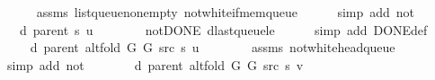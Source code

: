 \begin{isabellebody}
\ \ \ \ \isamarkupfalse%
\ assms\ list{\isacharunderscore}{\kern0pt}queue{\isacharunderscore}{\kern0pt}non{\isacharunderscore}{\kern0pt}empty\ not{\isacharunderscore}{\kern0pt}white{\isacharunderscore}{\kern0pt}if{\isacharunderscore}{\kern0pt}mem{\isacharunderscore}{\kern0pt}queue\isanewline
\ \ \ \ \isamarkupfalse%
\ {\isacharparenleft}{\kern0pt}simp\ add{\isacharcolon}{\kern0pt}\ not{\isacharunderscore}{\kern0pt}{\isacharparenleft}{\kern0pt}{}{\isacharparenright}{\kern0pt}{\isacharparenright}{\kern0pt}\isanewline
\ \ \isamarkupfalse%
\ \isamarkupfalse%
\ {\isachardoublequoteopen}{\isachardot}{\kern0pt}{\isachardot}{\kern0pt}{\isachardot}{\kern0pt}\ {\isasymle}\ d\ {\isacharparenleft}{\kern0pt}parent\ s{\isacharparenright}{\kern0pt}\ {\isacharquery}{\kern0pt}u\ {\isacharplus}{\kern0pt}\ {}{\isachardoublequoteclose}\isanewline
\ \ \ \ \isamarkupfalse%
\ not{\isacharunderscore}{\kern0pt}DONE\ d{\isacharunderscore}{\kern0pt}last{\isacharunderscore}{\kern0pt}queue{\isacharunderscore}{\kern0pt}le\isanewline
\ \ \ \ \isamarkupfalse%
\ {\isacharparenleft}{\kern0pt}simp\ add{\isacharcolon}{\kern0pt}\ DONE{\isacharunderscore}{\kern0pt}def{\isacharparenright}{\kern0pt}\isanewline
\ \ \isamarkupfalse%
\ \isamarkupfalse%
\ {\isachardoublequoteopen}{\isachardot}{\kern0pt}{\isachardot}{\kern0pt}{\isachardot}{\kern0pt}\ {\isacharequal}{\kern0pt}\ d\ {\isacharparenleft}{\kern0pt}parent\ {\isacharparenleft}{\kern0pt}alt{\isacharunderscore}{\kern0pt}fold\ G{}\ G{}\ src\ s{\isacharparenright}{\kern0pt}{\isacharparenright}{\kern0pt}\ {\isacharquery}{\kern0pt}u\ {\isacharplus}{\kern0pt}\ {}{\isachardoublequoteclose}\isanewline
\ \ \ \ \isamarkupfalse%
\ assms\ not{\isacharunderscore}{\kern0pt}white{\isacharunderscore}{\kern0pt}head{\isacharunderscore}{\kern0pt}queue\isanewline
\ \ \ \ \isamarkupfalse%
\ {\isacharparenleft}{\kern0pt}simp\ add{\isacharcolon}{\kern0pt}\ not{\isacharunderscore}{\kern0pt}{\isacharparenleft}{\kern0pt}{}{\isacharparenright}{\kern0pt}{\isacharparenright}{\kern0pt}\isanewline
\ \ \isamarkupfalse%
\ \isamarkupfalse%
\ {\isachardoublequoteopen}{\isachardot}{\kern0pt}{\isachardot}{\kern0pt}{\isachardot}{\kern0pt}\ {\isacharequal}{\kern0pt}\ d\ {\isacharparenleft}{\kern0pt}parent\ {\isacharparenleft}{\kern0pt}alt{\isacharunderscore}{\kern0pt}fold\ G{}\ G{}\ src\ s{\isacharparenright}{\kern0pt}{\isacharparenright}{\kern0pt}\ v{\isachardoublequoteclose}\isanewline

\end{isabellebody}
